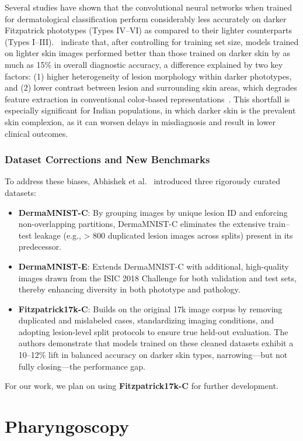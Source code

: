 Several studies have shown that the convolutional neural networks when trained for dermatological classification perform considerably less accurately on darker Fitzpatrick phototypes (Types IV–VI) as compared to their lighter counterparts (Types I–III).~\cite{abhi} indicate that, after controlling for training set size, models trained on lighter skin images performed better than those trained on darker skin by as much as 15\% in overall diagnostic accuracy, a difference explained by two key factors: (1) higher heterogeneity of lesion morphology within darker phototypes, and (2) lower contrast between lesion and surrounding skin areas, which degrades feature extraction in conventional color‐based representations~\cite{abhi}. This shortfall is especially significant for Indian populations, in which darker skin is the prevalent skin complexion, as it can worsen delays in misdiagnosis and result in lower clinical outcomes.

\subsubsection{Dataset Corrections and New Benchmarks}
To address these biases, Abhishek et al.~\cite{abhi} introduced three rigorously curated datasets:
\begin{itemize}
    \item \textbf{DermaMNIST-C}: By grouping images by unique lesion ID and enforcing non-overlapping partitions, DermaMNIST-C eliminates the extensive train–test leakage (e.g., > 800 duplicated lesion images across splits) present in its predecessor.
    \item \textbf{DermaMNIST-E}: Extends DermaMNIST-C with additional, high-quality images drawn from the ISIC 2018 Challenge for both validation and test sets, thereby enhancing diversity in both phototype and pathology.
    \item \textbf{Fitzpatrick17k-C}: Builds on the original 17k image corpus by removing duplicated and mislabeled cases, standardizing imaging conditions, and adopting lesion-level split protocols to ensure true held-out evaluation. The authors demonstrate that models trained on these cleaned datasets exhibit a 10–12\% lift in balanced accuracy on darker skin types, narrowing—but not fully closing—the performance gap.
\end{itemize}

For our work, we plan on using \textbf{Fitzpatrick17k-C} for further development. 

\section{Pharyngoscopy}

